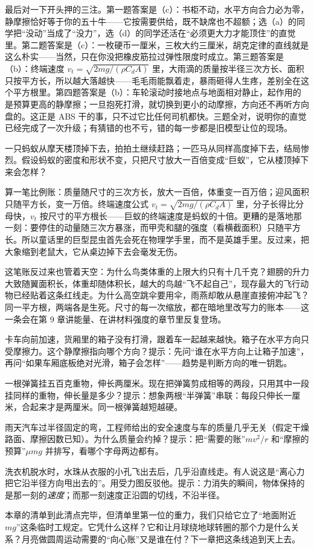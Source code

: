 最后对一下开头押的三注。第一题答案是（c）：书柜不动，水平方向合力必为零，静摩擦恰好等于你的五十牛——它按需要供给，既不缺席也不超额；选（a）的同学把“没动”当成了“没力”，选（d）的同学还活在“必须更大力才能顶住”的直觉里。第二题答案是（c）：一枚硬币一厘米，三枚大约三厘米，胡克定律的直线就是这么朴实——当然，只在你没把橡皮筋拉过弹性限度时成立。第三题答案是（b）：终端速度 \(v_t=\sqrt{2mg/(\rho C_d A)}\) 里，大雨滴的质量按半径三次方长、面积只按平方长，所以越大落越快——毛毛雨能飘着走，暴雨砸得人生疼，差别全在这个平方根里。第四题答案是（b）：车轮滚动时接地点与地面相对静止，起作用的是预算更高的静摩擦；一旦抱死打滑，就切换到更小的动摩擦，方向还不再听方向盘的。这正是 ABS 干的事，只不过它比任何司机都快。三题全对，说明你的直觉已经完成了一次升级；有猜错的也不亏，错的每一步都是旧模型让位的现场。


\begin{thought}[把蚂蚁放大一百倍]
一只蚂蚁从摩天楼顶掉下去，拍拍土继续赶路；一匹马从同样高度掉下去，结局惨烈。假设蚂蚁的密度和形状不变，只把尺寸放大一百倍变成“巨蚁”，它从楼顶掉下来会怎样？

算一笔比例账：质量随尺寸的三次方长，放大一百倍，体重变一百万倍；迎风面积只随平方长，变一万倍。终端速度公式 \(v_t=\sqrt{2mg/(\rho C_d A)}\) 里，分子长得比分母快，\(v_t\) 按尺寸的平方根长——巨蚁的终端速度是蚂蚁的十倍。更糟的是落地那一刻：要停住的动量随三次方暴涨，而甲壳和腿的强度（看横截面积）只随平方长。所以童话里的巨型昆虫首先会死在物理学手里，而不是英雄手里。反过来，把大象缩到老鼠大，它从桌边掉下去会毫发无伤。

这笔账反过来也管着天空：为什么鸟类体重的上限大约只有十几千克？翅膀的升力大致随翼面积长，体重却随体积长，越大的鸟越“飞不起自己”，现存最大的飞行动物已经贴着这条红线走。为什么高空跳伞要用伞，雨燕却敢从悬崖直接俯冲起飞？同一平方根，两端各是生死。尺寸的每一次缩放，都在暗地里改写力的账本——这一条会在第 9 章讲能量、在讲材料强度的章节里反复登场。
\end{thought}

\begin{puzzles}
\item 卡车向前加速，货厢里的箱子没有打滑，跟着车一起越来越快。箱子在水平方向只受摩擦力。这个静摩擦指向哪个方向？提示：先问“谁在水平方向上让箱子加速”，再问“如果车厢底板绝对光滑，箱子会怎样”——趋势是判断方向的唯一钥匙。

\item 一根弹簧挂五百克重物，伸长两厘米。现在把弹簧剪成相等的两段，只用其中一段挂同样的重物，伸长量是多少？提示：想象两根“半弹簧”串联：每段只伸长一厘米，合起来才是两厘米。同一根弹簧越短越硬。

\item 雨天汽车过半径固定的弯，工程师给出的安全速度与车的质量几乎无关（假定干燥路面、摩擦因数已知）。为什么质量会约掉？提示：把“需要的账”\(mv^2/r\) 和“摩擦的预算”\(\mu mg\) 并排写，看哪个字母两边都有。

\item 洗衣机脱水时，水珠从衣服的小孔飞出去后，几乎沿直线走。有人说这是“离心力把它沿半径方向甩出去的”。用受力图反驳他。提示：力消失的瞬间，物体保持的是那一刻的\emph{速度}；而那一刻速度正沿圆的切线，不沿半径。
\end{puzzles}

本章的清单到此清点完毕，但清单里第一位的重力，我们只给它立了“地面附近 \(mg\)”这条临时工规定。它凭什么这样？它和让月球绕地球转圈的那个力是什么关系？月亮做圆周运动需要的“向心账”又是谁在付？下一章把这条线追到天上去。
